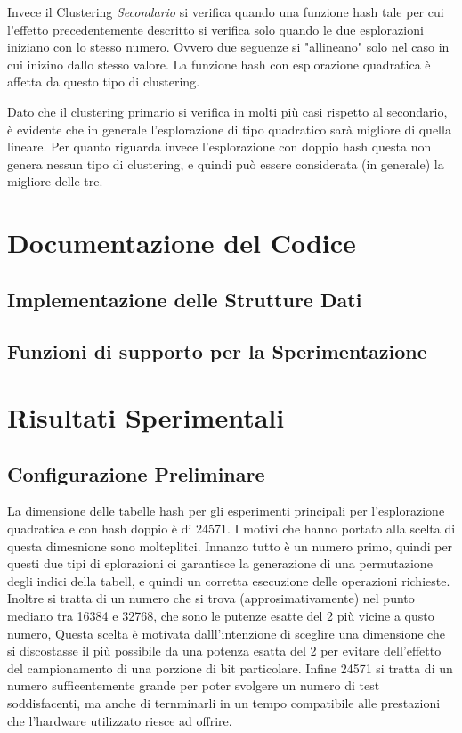 \documentclass{article}
\begin{document}
Invece il Clustering \emph{Secondario} si verifica quando una funzione hash tale per cui l'effetto precedentemente descritto si verifica solo quando le due esplorazioni iniziano con lo stesso numero. Ovvero due seguenze si "allineano" solo nel caso in cui inizino dallo stesso valore. La funzione hash con esplorazione quadratica è affetta da questo tipo di clustering.

Dato che il clustering primario si verifica in molti più casi rispetto al secondario, è evidente che in generale l'esplorazione di tipo quadratico sarà migliore di quella lineare. Per quanto riguarda invece l'esplorazione con doppio hash questa non genera nessun tipo di clustering, e quindi può essere considerata (in generale) la migliore delle tre.

\section{Documentazione del Codice}
\subsection{Implementazione delle Strutture Dati}

\subsection{Funzioni di supporto per la Sperimentazione}

\section{Risultati Sperimentali}

\subsection{Configurazione Preliminare}

La dimensione delle tabelle hash per gli esperimenti principali per l'esplorazione quadratica e con hash doppio è di 24571. I motivi che hanno portato alla scelta di questa dimesnione sono molteplitci. Innanzo tutto è un numero primo, quindi per questi due tipi di eplorazioni ci garantisce la generazione di una permutazione degli indici della tabell, e quindi un corretta esecuzione delle operazioni richieste. Inoltre si tratta di un numero che si trova (approsimativamente) nel punto mediano tra 16384 e 32768, che sono le putenze esatte del 2 più vicine a qusto numero, Questa scelta è motivata dalll'intenzione di sceglire una dimensione che si discostasse il più possibile da una potenza esatta del 2 per evitare dell'effetto del campionamento di una porzione di bit particolare. Infine 24571 si tratta di un numero sufficentemente grande per poter svolgere un numero di test soddisfacenti, ma anche di ternminarli in un tempo compatibile alle prestazioni che l'hardware utilizzato riesce ad offrire.
\end{document}
